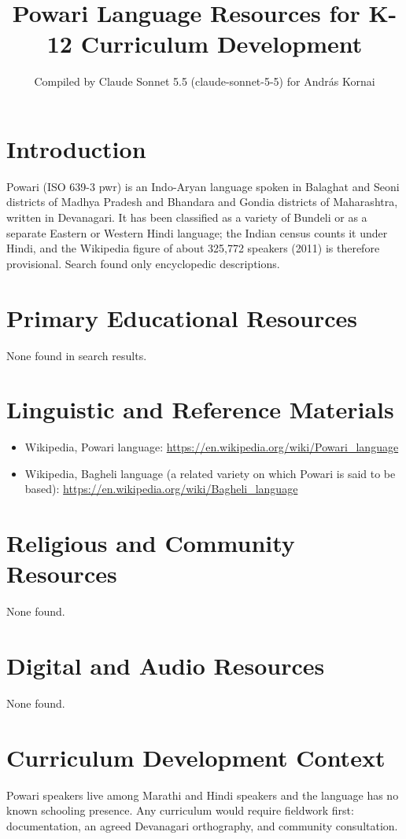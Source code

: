 \documentclass[12pt]{article}
\title{Powari Language Resources for K-12 Curriculum Development}
\author{Compiled by Claude Sonnet 5.5 (claude-sonnet-5-5) for Andr\'as Kornai}
\date{}
\begin{document}
\maketitle

\section{Introduction}
Powari (ISO 639-3 pwr) is an Indo-Aryan language spoken in Balaghat and Seoni districts of Madhya Pradesh and Bhandara and Gondia districts of Maharashtra, written in Devanagari. It has been classified as a variety of Bundeli or as a separate Eastern or Western Hindi language; the Indian census counts it under Hindi, and the Wikipedia figure of about 325,772 speakers (2011) is therefore provisional. Search found only encyclopedic descriptions.

\section{Primary Educational Resources}
None found in search results.

\section{Linguistic and Reference Materials}
\begin{itemize}
\item Wikipedia, Powari language: \url{https://en.wikipedia.org/wiki/Powari_language}
\item Wikipedia, Bagheli language (a related variety on which Powari is said to be based): \url{https://en.wikipedia.org/wiki/Bagheli_language}
\end{itemize}

\section{Religious and Community Resources}
None found.

\section{Digital and Audio Resources}
None found.

\section{Curriculum Development Context}
Powari speakers live among Marathi and Hindi speakers and the language has no known schooling presence. Any curriculum would require fieldwork first: documentation, an agreed Devanagari orthography, and community consultation.
\end{document}
